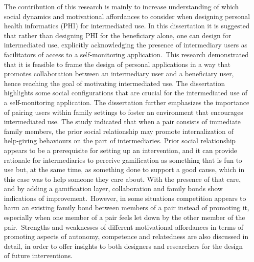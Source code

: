 The contribution of this research is mainly to increase understanding of which social dynamics and motivational affordances to consider when designing personal health informatics (PHI) for intermediated use. In this dissertation it is suggested that rather than designing PHI for the beneficiary alone, one can design for intermediated use, explicitly acknowledging the presence of intermediary users as facilitators of access to a self-monitoring application.~This research demonstrated that it is feasible to frame the design of personal applications in a way that promotes collaboration between an intermediary user and a beneficiary user, hence reaching the goal of motivating intermediated use. The dissertation highlights some social configurations that are crucial for the intermediated use of a self-monitoring application. The dissertation further emphasizes the importance of pairing users within family settings to foster an environment that encourages intermediated use.  The study indicated that when a pair consists of immediate family members, the prior social relationship may promote internalization of help-giving behaviours on the part of intermediaries. Prior social relationship appears to be a prerequisite for setting up an intervention, and it can provide rationale for intermediaries to perceive gamification as something that is fun to use but, at the same time, as something done to support a good cause, which in this case was to help someone they care about. With the presence of that care, and by adding a gamification layer,  collaboration and family bonds show indications of improvement.~However, in some situations competition appears to harm an existing family bond between members of a pair instead of promoting it, especially when one member of a pair feels let down by the other member of the pair.~Strengths and weaknesses of different motivational affordances in terms of promoting aspects of autonomy, competence and relatedness are also discussed in detail, in order to offer insights to both designers and researchers for the design of future interventions.
